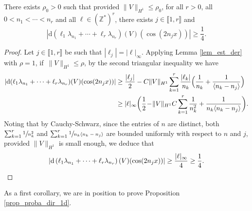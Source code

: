 \begin{lemma} \label{lem_14}There exists $\rho_0>0$ such that provided $\|V\|_{H^1}\leq \rho_0$, for all $r>0$, all $0<n_1<\cdots<n_{r}$ and all $\ell\in (\mathbb{Z}^*)^{r}$, there exists $j\in \llbracket 1,r \rrbracket$ and
\[
|\mathrm{d}\left(\ell_1 \lambda_{n_1}+\cdots+\ell_r \lambda_{n_r} \right)(V)(\cos(2n_jx))| \geq \frac14.
\]
\end{lemma}
\begin{proof}
Let $j \in \llbracket 1,r \rrbracket$ be such that $|\ell_j|=|\ell|_\infty$. Applying Lemma \ref{lem_est_der} with $\rho=1$, if~$\|V\|_{H^1}\leq \rho$, by the second triangular inequality we have
\begin{equation*}
\begin{split}
|\mathrm{d}(\ell_1 \lambda_{n_1}+\cdots+\ell_r \lambda_{n_r})(V)(\cos(2n_jx))|
&\geq \frac{|\ell_j|}2 -C \|V\|_{H^1} \sum_{k=1}^{r} \frac{|\ell_k|}{n_k} \Bigl(\frac{1}{n_k} + \frac1{\langle n_k-n_j \rangle} \Bigr) \\
&\geq |\ell|_\infty \biggl(\frac12 \!-\! \|V\|_{H^1} C \sum_{k=1}^{r} \frac{1}{n_k^2} + \frac1{n_k\langle n_k-n_j \rangle} \biggr).
\end{split}
\end{equation*}
Noting that by Cauchy-Schwarz, since the entries of $n$ are distinct, both $\sum_{k=1}^{r} \sfrac{1}{n_k^2}$ and $\sum_{k=1}^{r} \sfrac1{n_k\langle n_k-n_j \rangle}$ are bounded uniformly with respect to $n$ and $j$, provided $\|V\|_{H^1}$ is small enough, we deduce that
\[
|\mathrm{d}\left(\ell_1 \lambda_{n_1}+\cdots+\ell_r \lambda_{n_r} \right)(V)(\cos(2n_jx))| \geq \frac{|\ell|_\infty}4 \geq \frac14.\qedhere
\]
\end{proof}
As a first corollary, we are in position to prove Proposition \ref{prop_proba_dir_1d}.
